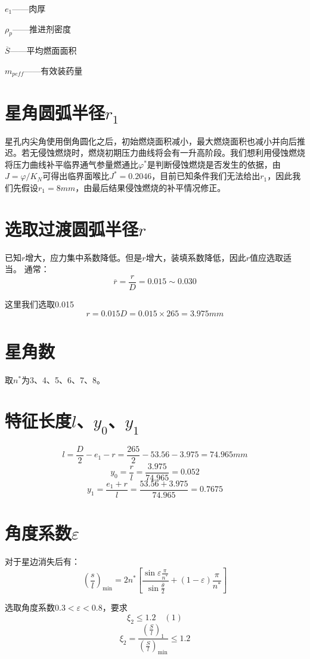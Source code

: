 $e_{1}$——肉厚

$\rho _{p}$——推进剂密度

$\overline{S}$——平均燃面面积

$m_{peff}$——有效装药量

\section{星角圆弧半径$r_{1}$}

星孔内尖角使用倒角圆化之后，初始燃烧面积减小，最大燃烧面积也减小并向后推迟。若无侵蚀燃烧时，燃烧初期压力曲线将会有一升高阶段。我们想利用侵蚀燃烧将压力曲线补平临界通气参量燃通比$\varphi^*$是判断侵蚀燃烧是否发生的依据，由$J=\varphi/K_N$可得出临界面喉比$J^*=0.2046$，目前已知条件我们无法给出$r_{1}$，因此我们先假设$r_{1}=8mm$，由最后结果侵蚀燃烧的补平情况修正。

\section{选取过渡圆弧半径$r$}
已知$r$增大，应力集中系数降低。但是$r$增大，装填系数降低，因此$r$值应选取适当。
通常：
\[
\overline{r}=\frac{r}{D}=0.015\sim 0.030
\]

这里我们选取0.015
\[
  r=0.015D=0.015\times 265=3.975mm
\]

\section{星角数}

取$n^*$为3、4、5、6、7、8。

\section{特征长度$l$、$y_{0}$、$y_{1}$}
\[
l=\frac{D}{2}-e_1-r=\frac{265}{2}-53.56-3.975=74.965mm
\]
\[
y_0=\frac{r}{l}=\frac{3.975}{74.965}=0.052
\]
\[
y_1=\frac{e_1+r}{l}=\frac{53.56+3.975}{74.965}=0.7675
\]

\section{角度系数\texorpdfstring{$\varepsilon $}{}}

对于星边消失后有：
\[
\left( \frac{s}{l} \right) _{\min}=2n^*\left[ \frac{\sin \varepsilon \frac{\pi}{n^*}}{\sin \frac{\overline{\theta }}{2}}+(1-\varepsilon )\frac{\pi}{n^*} \right] 
\]

选取角度系数$0.3< \varepsilon <0.8$，要求
\[
\xi _2\leqslant 1.2  \hspace{1em}(1)
\]
\[
\xi _2=\frac{\left( \frac{S}{l} \right) _1}{\left( \frac{S}{l} \right) _{\min}}\le 1.2
\]


